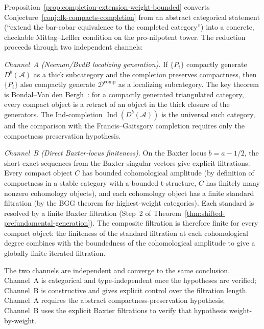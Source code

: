 \begin{remark}
\label{rem:dk-compacts-reduction}
Proposition~\ref{prop:completion-extension-weight-bounded} converts
Conjecture~\ref{conj:dk-compacts-completion} from an abstract
categorical statement \textup{(}``extend the bar-cobar equivalence to
the completed category''\textup{)} into a concrete, checkable
Mittag--Leffler condition on the pro-nilpotent tower. The reduction
proceeds through two independent channels:

\medskip\noindent\emph{Channel~A \textup{(}Neeman/BvdB localizing
generation\textup{)}.} If $\{P_i\}$ compactly generate
$D^b(\mathcal{A})$ as a thick subcategory and the completion
preserves compactness, then $\{P_i\}$ also compactly generate
$\mathcal{D}^{\mathrm{comp}}$ as a localizing subcategory.
The key theorem is
Bondal--Van den Bergh~\cite[Cor.~3.1.2]{BondalVdB03}: for a
compactly generated triangulated category, every compact object is a
retract of an object in the thick closure of the generators.
The Ind-completion $\operatorname{Ind}(D^b(\mathcal{A}))$ is the
universal such category, and the comparison with the
Francis--Gaitsgory completion requires only the compactness
preservation hypothesis.

\medskip\noindent\emph{Channel~B \textup{(}Direct Baxter-locus
finiteness\textup{)}.}
On the Baxter locus $b = a - 1/2$, the short exact sequences from
the Baxter singular vectors give explicit filtrations.
Every compact object $C$ has bounded cohomological amplitude
\textup{(}by definition of compactness in a stable category with a
bounded t-structure, $C$ has finitely many nonzero cohomology
objects\textup{)}, and each cohomology object has a finite standard
filtration \textup{(}by the BGG theorem for highest-weight
categories\textup{)}. Each standard is resolved by a finite Baxter
filtration \textup{(}Step~2 of
Theorem~\ref{thm:shifted-prefundamental-generation}\textup{)}.
The composite filtration is therefore finite for every compact
object: the finiteness of the standard filtration at each
cohomological degree combines with the boundedness of the
cohomological amplitude to give a globally finite iterated filtration.

The two channels are independent and converge to the same conclusion.
Channel~A is categorical and type-independent once the hypotheses are
verified; Channel~B is constructive and gives explicit control over
the filtration length. Channel~A requires the abstract
compactness-preservation hypothesis; Channel~B uses the explicit
Baxter filtrations to verify that hypothesis weight-by-weight.
\end{remark}


